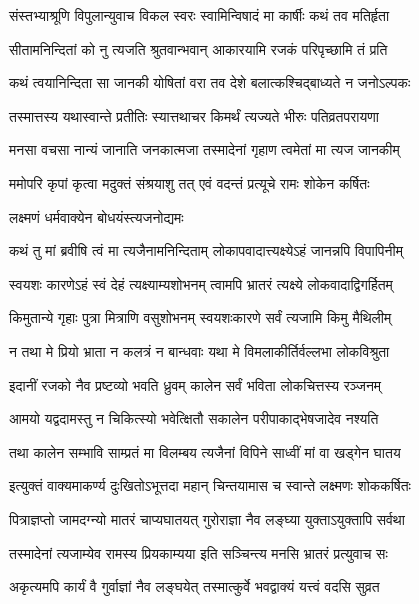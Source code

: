 \twolineshloka
{संस्तभ्याश्रूणि विपुलान्युवाच विकल स्वरः}
{स्वामिन्विषादं मा कार्षीः कथं तव मतिर्हृता}%

\twolineshloka
{सीतामनिन्दितां को नु त्यजति श्रुतवान्भवान्}
{आकारयामि रजकं परिपृच्छामि तं प्रति}%

\twolineshloka
{कथं त्वयानिन्दिता सा जानकी योषितां वरा}
{तव देशे बलात्कश्चिद्बाध्यते न जनोऽल्पकः}%

\twolineshloka
{तस्मात्तस्य यथास्वान्ते प्रतीतिः स्यात्तथाचर}
{किमर्थं त्यज्यते भीरुः पतिव्रतपरायणा}%

\twolineshloka
{मनसा वचसा नान्यं जानाति जनकात्मजा}
{तस्मादेनां गृहाण त्वमेतां मा त्यज जानकीम्}%

\twolineshloka
{ममोपरि कृपां कृत्वा मदुक्तं संश्रयाशु तत्}
{एवं वदन्तं प्रत्यूचे रामः शोकेन कर्षितः}%

\onelineshloka
{लक्ष्मणं धर्मवाक्येन बोधयंस्त्यजनोद्यमः}%


\twolineshloka
{कथं तु मां ब्रवीषि त्वं मा त्यजैनामनिन्दिताम्}
{लोकापवादात्त्यक्ष्येऽहं जानन्नपि विपापिनीम्}%

\twolineshloka
{स्वयशः कारणेऽहं स्वं देहं त्यक्ष्याम्यशोभनम्}
{त्वामपि भ्रातरं त्यक्ष्ये लोकवादाद्विगर्हितम्}%

\twolineshloka
{किमुतान्ये गृहाः पुत्रा मित्राणि वसुशोभनम्}
{स्वयशःकारणे सर्वं त्यजामि किमु मैथिलीम्}%

\twolineshloka
{न तथा मे प्रियो भ्राता न कलत्रं न बान्धवाः}
{यथा मे विमलाकीर्तिर्वल्लभा लोकविश्रुता}%

\twolineshloka
{इदानीं रजको नैव प्रष्टव्यो भवति ध्रुवम्}
{कालेन सर्वं भविता लोकचित्तस्य रञ्जनम्}%

\twolineshloka
{आमयो यद्वदामस्तु न चिकित्स्यो भवेत्क्षितौ}
{सकालेन परीपाकाद्भेषजादेव नश्यति}%

\twolineshloka
{तथा कालेन सम्भावि साम्प्रतं मा विलम्बय}
{त्यजैनां विपिने साध्वीं मां वा खड्गेन घातय}%

\twolineshloka
{इत्युक्तं वाक्यमाकर्ण्य दुःखितोऽभूत्तदा महान्}
{चिन्तयामास च स्वान्ते लक्ष्मणः शोककर्षितः}%

\twolineshloka
{पित्राज्ञप्तो जामदग्न्यो मातरं चाप्यघातयत्}
{गुरोराज्ञा नैव लङ्घ्या युक्ताऽयुक्तापि सर्वथा}%

\twolineshloka
{तस्मादेनां त्यजाम्येव रामस्य प्रियकाम्यया}
{इति सञ्चिन्त्य मनसि भ्रातरं प्रत्युवाच सः}%


\twolineshloka
{अकृत्यमपि कार्यं वै गुर्वाज्ञां नैव लङ्घयेत्}
{तस्मात्कुर्वे भवद्वाक्यं यत्त्वं वदसि सुव्रत}%


